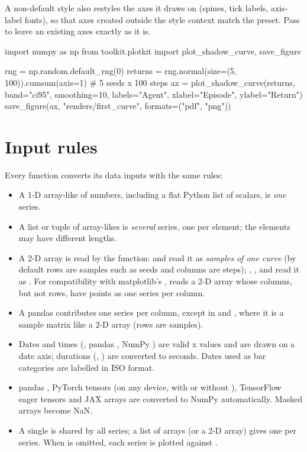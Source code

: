 A non-default style also restyles the axes it draws on (spines, tick labels,
axis-label fonts), so that axes created outside the style context match the
preset. Pass  to leave an existing axes exactly as it
is.

\begin{pycode}
import numpy as np
from toolkit.plotkit import plot_shadow_curve, save_figure

rng = np.random.default_rng(0)
returns = rng.normal(size=(5, 100)).cumsum(axis=1)     # 5 seeds x 100 steps
ax = plot_shadow_curve(returns, band="ci95", smoothing=10, labels="Agent",
                       xlabel="Episode", ylabel="Return")
save_figure(ax, "renders/first_curve", formats=("pdf", "png"))
\end{pycode}

\section{Input rules}\label{sec:plotkit-inputs}

Every function converts its data inputs with the same rules:

\begin{itemize}
  \item A 1-D array-like of numbers, including a flat Python list of scalars,
    is \emph{one} series.
  \item A list or tuple of array-likes is \emph{several} series, one per
    element; the elements may have different lengths.
  \item A 2-D array is read by the function:  and
     read it as \emph{samples of one curve}
    (by default rows are samples such as seeds and columns are steps);
    , ,  and
     read it as . For
    compatibility with matplotlib's , 
    reads a 2-D array whose columns, but not rows, have  points as
    one series per column.
  \item A pandas  contributes one series per column, except in
     and , where it is
    a sample matrix like a 2-D array (rows are samples).
  \item Dates and times (, pandas , NumPy
    ) are valid x values and are drawn on a date axis;
    durations (, ) are converted to seconds.
    Dates used as bar categories are labelled in ISO format.
  \item pandas , PyTorch tensors (on any device, with or without
    ), TensorFlow eager tensors and JAX arrays are
    converted to NumPy automatically. Masked arrays become NaN.
  \item A single  is shared by all series; a list of arrays (or a 2-D
    array) gives one  per series. When  is omitted, each series
    is plotted against .
\end{itemize}

